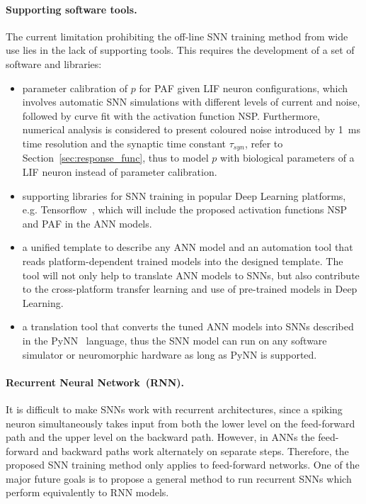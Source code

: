 \paragraph{Supporting software tools.}
The current limitation prohibiting the off-line SNN training method from wide use lies in the lack of supporting tools.
This requires the development of a set of software and libraries:

\begin{itemize}
	\item parameter calibration of $p$ for PAF given LIF neuron configurations, which involves automatic SNN simulations with different levels of current and noise, followed by curve fit with the activation function NSP. 
	Furthermore, numerical analysis is considered to present coloured noise introduced by 1~ms time resolution and the synaptic time constant $\tau_{syn}$, refer to Section~\ref{sec:response_func}, thus to model $p$ with biological parameters of a LIF neuron instead of parameter calibration.
	
	\item supporting libraries for SNN training in popular Deep Learning platforms, e.g. Tensorflow~\citep{tensorflow2015-whitepaper}, which will include the proposed activation functions NSP and PAF in the ANN models.
	
	\item a unified template to describe any ANN model and an automation tool that reads platform-dependent trained models into the designed template.
	The tool will not only help to translate ANN models to SNNs, but also contribute to the cross-platform transfer learning and use of pre-trained models in Deep Learning.
	
	\item a translation tool that converts the tuned ANN models into SNNs described in the PyNN~\citep{davison2008pynn} language, thus the SNN model can run on any software simulator or neuromorphic hardware as long as PyNN is supported.
\end{itemize}

\paragraph{Recurrent Neural Network~(RNN).}
It is difficult to make SNNs work with recurrent architectures, since a spiking neuron simultaneously takes input from both the lower level on the feed-forward path and the upper level on the backward path.
However, in ANNs the feed-forward and backward paths work alternately on separate steps.
Therefore, the proposed SNN training method only applies to feed-forward networks.
One of the major future goals is to propose a general method to run recurrent SNNs which perform equivalently to RNN models.

